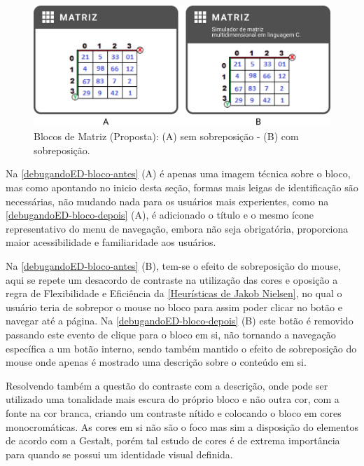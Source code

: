 \begin{figure}[htb]
    \begin{center}
	    \includegraphics[scale=0.52]{figs/debugandoED-bloco-depois.png}
	\end{center}
        \caption{\label{debugandoED-bloco-depois}Blocos de Matriz (Proposta): (A) sem sobreposição - (B) com sobreposição.}
\end{figure}

Na \autoref{debugandoED-bloco-antes} (A) é apenas uma imagem técnica sobre o bloco, mas como apontando no inicio desta seção, formas mais leigas de identificação são necessárias, não mudando nada para os usuários mais experientes, como na \autoref{debugandoED-bloco-depois} (A), é adicionado o título e o mesmo ícone representativo do menu de navegação, embora não seja obrigatória, proporciona maior acessibilidade e familiaridade aos usuários. 

Na \autoref{debugandoED-bloco-antes} (B), tem-se o efeito de sobreposição do mouse, aqui se repete um desacordo de contraste na utilização das cores e oposição a regra de Flexibilidade e Eficiência da \autoref{Heurísticas de Jakob Nielsen}, no qual o usuário teria de sobrepor o mouse no bloco para assim poder clicar no botão e navegar até a página. Na \autoref{debugandoED-bloco-depois} (B) este botão é removido passando este evento de clique para o bloco em si, não tornando a navegação específica a um botão interno, sendo também mantido o efeito de sobreposição do mouse onde apenas é mostrado uma descrição sobre o conteúdo em si.

Resolvendo também a questão do contraste com a descrição, onde pode ser utilizado uma tonalidade mais escura do próprio bloco e não outra cor, com a fonte na cor branca, criando um contraste nítido e colocando o bloco em cores monocromáticas. As cores em si não são o foco mas sim a disposição do elementos de acordo com a Gestalt, porém tal estudo de cores é de extrema importância para quando se possui um identidade visual definida.

